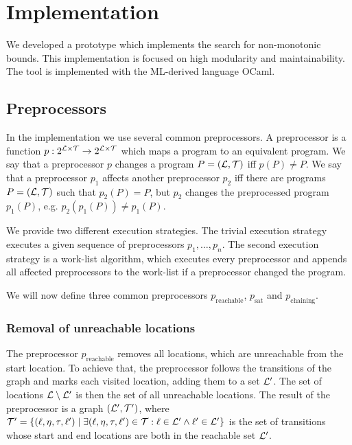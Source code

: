 \section{Implementation}

We developed a prototype which implements the search for non-monotonic bounds.
This implementation is focused on high modularity and maintainability.
The tool is implemented with the ML-derived language OCaml.

\subsection{Preprocessors}

In the implementation we use several common preprocessors.
A preprocessor is a function $p: 2^{\mathcal{L} \times \mathcal{T}} \rightarrow 2^{\mathcal{L} \times \mathcal{T}}$ which maps a program to an equivalent program.
We say that a preprocessor $p$ changes a program $P = (\mathcal{L}, \mathcal{T})$ iff $p(P) \neq P$.
We say that a preprocessor $p_1$ affects another preprocessor $p_2$ iff there are programs $P = (\mathcal{L}, \mathcal{T})$ such that $p_2(P) = P$, but $p_2$ changes the preprocessed program $p_1(P)$, e.g. $p_2(p_1(P)) \neq p_1(P)$.

We provide two different execution strategies.
The trivial execution strategy executes a given sequence of preprocessors $p_1, \dots, p_n$.
The second execution strategy is a work-list algorithm, which executes every preprocessor and appends all affected preprocessors to the work-list if a preprocessor changed the program.

We will now define three common preprocessors $p_{\text{reachable}}$, $p_{\text{sat}}$ and $p_{\text{chaining}}$.

\subsubsection{Removal of unreachable locations}

The preprocessor $p_{\text{reachable}}$ removes all locations, which are unreachable from the start location.
To achieve that, the preprocessor follows the transitions of the graph and marks each visited location, adding them to a set $\mathcal{L}'$.
The set of locations $\mathcal{L} \setminus \mathcal{L}'$ is then the set of all unreachable locations.
The result of the preprocessor is a graph $(\mathcal{L}', \mathcal{T}')$, where $\mathcal{T}' = \lbrace (\ell,\eta,\tau,\ell') \mid \exists (\ell,\eta,\tau,\ell') \in \mathcal{T}: \ell \in \mathcal{L}' \wedge \ell' \in \mathcal{L}' \rbrace$ is the set of transitions whose start and end locations are both in the reachable set $\mathcal{L}'$.

